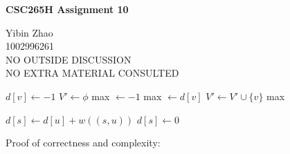 \documentclass[10pt]{article}
\begin{document}
\begin{center}
{\bf \Large \bf CSC265H Assignment 10}
\end{center}

\noindent
Yibin Zhao\\
1002996261\\
NO OUTSIDE DISCUSSION\\
NO EXTRA MATERIAL CONSULTED\\

\begin{comment}
	Give an algorithm that, given a directed graph $G=(V,E)$ which contains no
	directed cycle and a weight function $w: E \rightarrow \mathbb{R}$, find
	a maximum weight path in $O(|V|+|E|)$ time.

	Prove that your algorithm is correct and has the required time complexity.
\end{comment}

\begin{algorithmic}[1]
			\State $d[v] \gets -1$
		\EndFor
		\State $V' \gets \phi$
		\State max $\gets -1$
				\State {}
			\EndIf
				\State max $\gets d[v]$
			\EndIf
			\State $V' \gets V' \cup \{v\}$
		\EndFor
		\State \Return max
	\EndFunction
\end{algorithmic}

\vspace{5mm}

\begin{algorithmic}[1]
				\State {}
			\EndIf
				\State $d[s] \gets d[u] + w((s, u))$ 
			\EndIf
		\EndFor
			\State $d[s] \gets 0$
		\EndIf
	\EndFunction
\end{algorithmic}

\vspace{5mm}

\setlength\parindent{0pt}
Proof of correctness and complexity:
\end{document}
